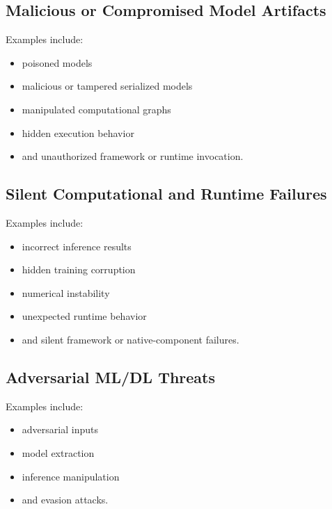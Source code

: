 \documentclass[
  12pt,
  letterpaper,
  oneside]{report}
\providecommand{\tightlist}{%
  \setlength{\itemsep}{0pt}\setlength{\parskip}{0pt}}
\begin{document}
\subsection{Malicious or Compromised Model Artifacts}\label{653-malicious-or-compromised-model-artifacts}

Examples include:

\begin{itemize}
\tightlist
\item
  poisoned models
\item
  malicious or tampered serialized models
\item
  manipulated computational graphs
\item
  hidden execution behavior
\item
  and unauthorized framework or runtime invocation.
\end{itemize}

\subsection{Silent Computational and Runtime Failures}\label{654-silent-computational-and-runtime-failures}

Examples include:

\begin{itemize}
\tightlist
\item
  incorrect inference results
\item
  hidden training corruption
\item
  numerical instability
\item
  unexpected runtime behavior
\item
  and silent framework or native-component failures.
\end{itemize}

\subsection{Adversarial ML/DL Threats}\label{655-adversarial-mldl-threats}

Examples include:

\begin{itemize}
\tightlist
\item
  adversarial inputs
\item
  model extraction
\item
  inference manipulation
\item
  and evasion attacks.
\end{itemize}
\end{document}
